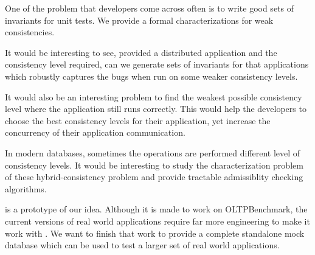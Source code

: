 One of the problem that developers come across often is to write good sets of invariants for unit tests. We provide a formal characterizations for weak consistencies.

It would be interesting to see, provided a distributed application and the consistency level required, can we generate sets of invariants for that applications which robustly captures the bugs when run on some weaker consistency levels.

It would also be an interesting problem to find the weakest possible consistency level where the application still runs correctly. This would help the developers to choose the best consistency levels for their application, yet increase the concurrency of their application communication.

In modern databases, sometimes the operations are performed different level of consistency levels. It would be interesting to study the characterization problem of these hybrid-consistency problem and provide tractable admissiblity checking algorithms.

\tool{} is a prototype of our idea. Although it is made to work on OLTPBenchmark, the current versions of real world applications require far more engineering to make it work with \tool{}. We want to finish that work to provide a complete standalone mock database which can be used to test a larger set of real world applications. 